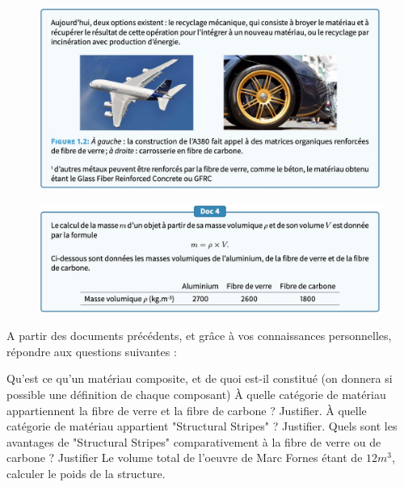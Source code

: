 \documentclass{exam}
\begin{document}
  \begin{minipage}[c]{0.45\linewidth}
    \begin{figure}[H]
      \centering
      \includegraphics[width=1.5\linewidth]{dst1_fig3.jpg}
    \end{figure}

    \begin{figure}[H]
      \centering
      \includegraphics[width=1.5\linewidth]{dst1_fig4.jpg}
    \end{figure}
  \end{minipage}

\vspace{1em}
A partir des documents précédents, et grâce à vos connaissances personnelles, répondre aux questions suivantes : 

\begin{questions}

\question[1] Qu'est ce qu'un matériau composite, et de quoi est-il constitué (on donnera si possible une définition de chaque composant)
\question[0.5] À quelle catégorie de matériau appartiennent la fibre de verre et la fibre de carbone ? Justifier.
\question[0.5] À quelle catégorie de matériau appartient "Structural Stripes" ? Justifier.
\question[1] Quels sont les avantages de "Structural Stripes" comparativement à la fibre de verre ou de carbone ? Justifier
\question[2] Le volume total de l'oeuvre de Marc Fornes étant de $12m^3$, calculer le poids de la structure.

\end{questions}
\end{document}
